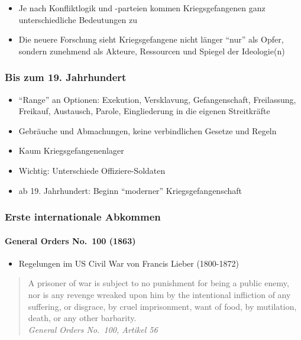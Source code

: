 {}\documentclass[a4paper]{article}
\providecommand{\tightlist}{\setlength{\itemsep}{1mm}\setlength{\parskip}{1mm}}
\begin{document}
\begin{itemize}
	\item
	      Je nach Konfliktlogik und -parteien kommen Kriegsgefangenen ganz
	      unterschiedliche Bedeutungen zu
	\item
	      Die neuere Forschung sieht Kriegsgefangene nicht länger ``nur'' als
	      Opfer, sondern zunehmend als Akteure, Ressourcen und Spiegel der
	      Ideologie(n)
\end{itemize}

\subsubsection{Bis zum 19. Jahrhundert}\label{bis-zum-19.-jahrhundert}

\begin{itemize}
	\tightlist
	\item
	      ``Range'' an Optionen: Exekution, Versklavung, Gefangenschaft,
	      Freilassung, Freikauf, Austausch, Parole, Eingliederung in die eigenen
	      Streitkräfte
	\item
	      Gebräuche und Abmachungen, keine verbindlichen Gesetze und Regeln
	\item
	      Kaum Kriegsgefangenenlager
	\item
	      Wichtig: Unterschiede Offiziere-Soldaten
	\item
	      ab 19. Jahrhundert: Beginn ``moderner'' Kriegsgefangenschaft
\end{itemize}

\subsubsection{Erste internationale
	Abkommen}\label{erste-internationale-abkommen}

\paragraph{General Orders No.~100
	(1863)}\label{general-orders-no.-100-1863}

\begin{itemize}
	\tightlist
	\item
	      Regelungen im US Civil War von Francis Lieber (1800-1872)
\end{itemize}

\begin{quote}
	A prisoner of war is subject to no punishment for being a public enemy,
	nor is any revenge wreaked upon him by the intentional infliction of any
	suffering, or disgrace, by cruel imprisonment, want of food, by
	mutilation, death, or any other barbarity.\\
	\emph{General Orders No.~100, Artikel 56}
\end{quote}
\end{document}
